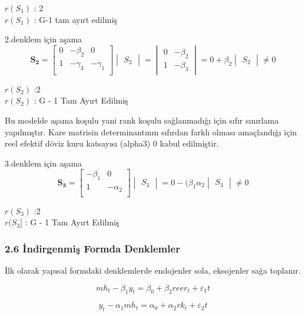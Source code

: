 \documentclass[]{article}
\begin{document}
\(r(S_1)\) : 2\\
\(r(S_1)\) : G-1 tam ayırt edilmiş

2.denklem için aşama \[\mathbf{S_2} = \left[\begin{array} {rrr}
0 & -\beta_2 & 0 \\
1 & -\gamma_3 & -\gamma_1 \\
\end{array}\right]    \begin{vmatrix} S_2 \end{vmatrix} = \begin{vmatrix} 0 & -\beta_2 \\ 1 & -\beta_3 \end{vmatrix} = 0 + \beta_2 \begin{vmatrix} S_2 \end{vmatrix} \neq 0\]

\(r(S_2)\) :2\\
\(r(S_2)\) : G - 1 Tam Ayırt Edilmiş

Bu modelde aşama koşulu yani rank koşulu sağlanmadığı için sıfır
sınırlama yapılmıştır. Kare matrisin determinantının sıfırdan farklı
olması amaçlandığı için reel efektif döviz kuru katsayısı (alpha3) 0
kabul edilmiştir.

3.denklem için aşama \[\mathbf{S_3} = \left[\begin{array} {rrr}
-\beta_1 & 0 \\
1 & -\alpha_2  \\
\end{array}\right]    \begin{vmatrix} S_3 \end{vmatrix} = 0 - (\beta_1 \alpha_2 \begin{vmatrix} S_3 \end{vmatrix} \neq 0\]

\(r(S_3)\) :2\\
\(r(S_3]\) : G - 1 Tam Ayırt Edilmiş

\subsubsection{2.6 İndirgenmiş Formda
Denklemler}\label{indirgenmis-formda-denklemler}

İlk olarak yapısal formdaki denklemlerde endojenler sola, eksojenler
sağa toplanır.

\[
mh_t - \beta_1 y_t = \beta_0 + \beta_2 reer_t + \varepsilon_1t
\]

\[
y_t - \alpha_1 mh_t = \alpha_0 + \alpha_2 rk_t + \varepsilon_2t
\]
\end{document}
